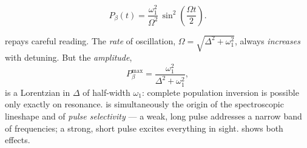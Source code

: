 \begin{keyresult}
\vspace{-0.35cm}
\begin{equation}
P_\beta(t) = \frac{\omega_1^2}{\Omega^2}\,\sin^2\!\left(\frac{\Omega t}{2}\right).
\label{eq:rabi}
\end{equation}
\end{keyresult}

\noindent
{} repays careful reading. The \emph{rate} of oscillation,
$\Omega=\sqrt{\Delta^2+\omega_1^2}$, always \emph{increases} with detuning. But the
\emph{amplitude},
%
\begin{equation}
P_\beta^{\max} = \frac{\omega_1^2}{\Delta^2+\omega_1^2},
\label{eq:lorentzian}
\end{equation}
%
is a Lorentzian in $\Delta$ of half-width $\omega_1$: complete population inversion is
possible only exactly on resonance.  is simultaneously the origin of
the spectroscopic lineshape and of \emph{pulse selectivity} --- a weak, long pulse
addresses a narrow band of frequencies; a strong, short pulse excites everything in
sight.  shows both effects.

